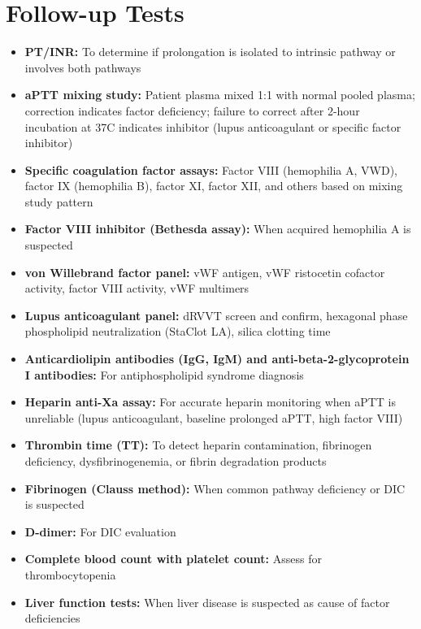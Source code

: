 \section*{Follow-up Tests}
\begin{itemize}
  \item \textbf{PT/INR:} To determine if prolongation is isolated to intrinsic pathway or involves both pathways
  \item \textbf{aPTT mixing study:} Patient plasma mixed 1:1 with normal pooled plasma; correction indicates factor deficiency; failure to correct after 2-hour incubation at 37\textdegree{}C indicates inhibitor (lupus anticoagulant or specific factor inhibitor)
  \item \textbf{Specific coagulation factor assays:} Factor VIII (hemophilia A, VWD), factor IX (hemophilia B), factor XI, factor XII, and others based on mixing study pattern
  \item \textbf{Factor VIII inhibitor (Bethesda assay):} When acquired hemophilia A is suspected
  \item \textbf{von Willebrand factor panel:} vWF antigen, vWF ristocetin cofactor activity, factor VIII activity, vWF multimers
  \item \textbf{Lupus anticoagulant panel:} dRVVT screen and confirm, hexagonal phase phospholipid neutralization (StaClot LA), silica clotting time
  \item \textbf{Anticardiolipin antibodies (IgG, IgM) and anti-beta-2-glycoprotein I antibodies:} For antiphospholipid syndrome diagnosis
  \item \textbf{Heparin anti-Xa assay:} For accurate heparin monitoring when aPTT is unreliable (lupus anticoagulant, baseline prolonged aPTT, high factor VIII)
  \item \textbf{Thrombin time (TT):} To detect heparin contamination, fibrinogen deficiency, dysfibrinogenemia, or fibrin degradation products
  \item \textbf{Fibrinogen (Clauss method):} When common pathway deficiency or DIC is suspected
  \item \textbf{D-dimer:} For DIC evaluation
  \item \textbf{Complete blood count with platelet count:} Assess for thrombocytopenia
  \item \textbf{Liver function tests:} When liver disease is suspected as cause of factor deficiencies
\end{itemize}

